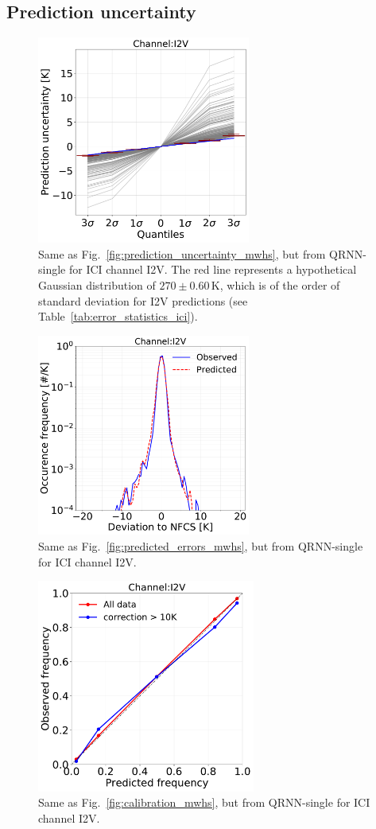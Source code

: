 \documentclass[amt, manuscript]{copernicus}
\begin{document}
\subsection{Prediction uncertainty}
\label{sec:prediction_uncertainty}
\begin{figure}[t]
	\includegraphics[width = 70mm]{Figures/prediction_uncertainty_I2V.pdf}	
	\caption{Same as Fig.~\ref{fig:prediction_uncertainty_mwhs}, but from QRNN-single for ICI channel I2V. The red line represents a hypothetical Gaussian distribution of $270\pm0.60$\,K, which is of the order of standard deviation for I2V predictions (see Table~\ref{tab:error_statistics_ici}).}
	\label{fig:prediction_uncertainty_I2V}	
\end{figure}
\begin{figure}[t]
	\includegraphics[width=70mm]{Figures/deviation_posterior_samples_I2V.pdf}	
	\caption{Same as Fig.~\ref{fig:predicted_errors_mwhs}, but from QRNN-single for ICI channel I2V.}
	\label{fig:predicted_errors}	
\end{figure}
\begin{figure}[t]
	\includegraphics[height = 70mm]{Figures/calibration_QRNN_I2V.pdf}	
	\caption{Same as Fig.~\ref{fig:calibration_mwhs}, but from QRNN-single for ICI channel I2V. }
	\label{fig:calibration_I1V}	
\end{figure}
\end{document}
